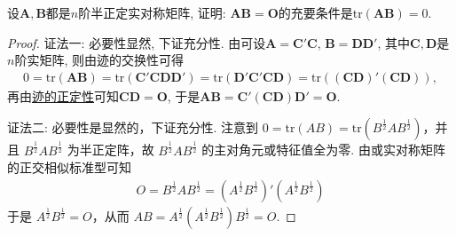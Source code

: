 \documentclass[../../main.tex]{subfiles}%
\begin{document}
\begin{proposition}\label{proposition:A为实半正定阵AB=O的充要条件为tr(AB)=0}
设$\boldsymbol{A}, \boldsymbol{B}$都是$n$阶半正定实对称矩阵, 证明: $\boldsymbol{A}\boldsymbol{B}=\boldsymbol{O}$的充要条件是$\text{tr}(\boldsymbol{A}\boldsymbol{B}) = 0$.
\end{proposition}
\begin{proof}

{\color{blue}证法一:}
必要性显然, 下证充分性. 由可设$\boldsymbol{A}=\boldsymbol{C}'\boldsymbol{C}$, $\boldsymbol{B}=\boldsymbol{D}\boldsymbol{D}'$, 其中$\boldsymbol{C}, \boldsymbol{D}$是$n$阶实矩阵, 则由迹的交换性可得
\begin{align*}
0 = \text{tr}(\boldsymbol{A}\boldsymbol{B}) = \text{tr}(\boldsymbol{C}'\boldsymbol{C}\boldsymbol{D}\boldsymbol{D}') = \text{tr}(\boldsymbol{D}'\boldsymbol{C}'\boldsymbol{C}\boldsymbol{D}) = \text{tr}\left((\boldsymbol{C}\boldsymbol{D})'(\boldsymbol{C}\boldsymbol{D})\right),
\end{align*}
再由\hyperref[proposition:零矩阵的充要条件]{迹的正定性}可知$\boldsymbol{C}\boldsymbol{D}=\boldsymbol{O}$, 于是$\boldsymbol{A}\boldsymbol{B}=\boldsymbol{C}'(\boldsymbol{C}\boldsymbol{D})\boldsymbol{D}'=\boldsymbol{O}$. 

{\color{blue}证法二:}
必要性是显然的，下证充分性. 注意到 \(0 = \mathrm{tr}(AB) = \mathrm{tr}(B^{\frac{1}{2}}AB^{\frac{1}{2}})\)，并且 \(B^{\frac{1}{2}}AB^{\frac{1}{2}}\) 为半正定阵，故 \(B^{\frac{1}{2}}AB^{\frac{1}{2}}\) 的主对角元或特征值全为零. 由或实对称矩阵的正交相似标准型可知
\begin{align*}
O = B^{\frac{1}{2}}AB^{\frac{1}{2}} = (A^{\frac{1}{2}}B^{\frac{1}{2}})'(A^{\frac{1}{2}}B^{\frac{1}{2}})
\end{align*}
于是 \(A^{\frac{1}{2}}B^{\frac{1}{2}} = O\)，从而 \(AB = A^{\frac{1}{2}}(A^{\frac{1}{2}}B^{\frac{1}{2}})B^{\frac{1}{2}} = O\). 

\end{proof}
\end{document}
